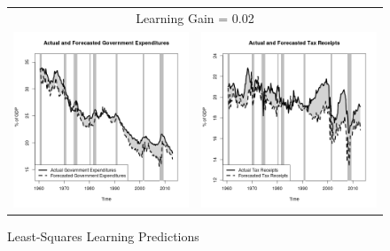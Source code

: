 \documentclass[11pt]{article}
\begin{document}
\begin{figure}\caption{Least-Squares Learning Predictions}\label{fg:forecasts0.02}
\begin{center}
\begin{tabular}{cc}
\multicolumn{2}{c}{Learning Gain = 0.02} \\ [0.5pc]
\includegraphics[scale=0.45]{./results/pics0.02/pred_gov.png} & \includegraphics[scale=0.45]{./results/pics0.02/pred_tax.png} \\

\end{tabular}
\end{center}
\end{figure}
\end{document}
